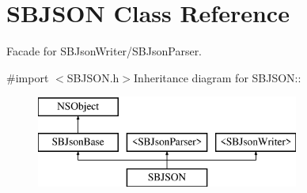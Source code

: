 \hypertarget{interface_s_b_j_s_o_n}{
\section{SBJSON Class Reference}
\label{interface_s_b_j_s_o_n}
}


Facade for SBJsonWriter/SBJsonParser.  


{\ttfamily \#import $<$SBJSON.h$>$}Inheritance diagram for SBJSON::\begin{figure}[H]
\begin{center}
\leavevmode
\includegraphics[height=3cm]{interface_s_b_j_s_o_n}
\end{center}
\end{figure}

